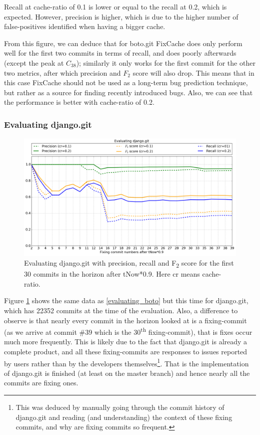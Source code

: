 \documentclass[12pt,twoside,notitlepage]{report}
\newcommand{\fxch}{FixCache}
\begin{document}
Recall at cache-ratio of 0.1 is lower or equal to the recall at 0.2, which is expected. However, precision is higher, which is due to the higher number of false-positives identified when having a bigger cache.

From this figure, we can deduce that for boto.git \fxch{} does only perform well for the first two commits in terms of recall, and does poorly afterwards (except the peak at $C_{38}$); similarly it only works for the first commit for the other two metrics, after which precision and $F_2$ score will also drop. This means that in this case \fxch{} should not be used as a long-term bug prediction technique, but rather as a source for finding recently introduced bugs. Also, we can see that the performance is better with cache-ratio of 0.2.
\subsubsection{Evaluating django.git}
\begin{figure}[ht!]
\includegraphics[width=1.0\textwidth]{evaluating_django.png}
\caption[Evaluating django.git: recall, precision and $F_2$ score]{Evaluating django.git with precision, recall and F\textsubscript{2} score for the first 30 commits in the horizon after tNow*0.9. Here cr means cache-ratio.}
\label{evaluating_django}
\end{figure}
Figure \ref{evaluating_django} shows the same data as \ref{evaluating_boto} but this time for django.git, which has 22352 commits at the time of the evaluation. Also, a difference to observe is that nearly every commit in the horizon looked at is a fixing-commit (as we arrive at commit \#39 which is the 30\textsuperscript{th} fixing-commit), that is fixes occur much more frequently. This is likely due to the fact that django.git is already a complete product, and all these fixing-commits are responses to issues reported by users rather than by the developers themselves\footnote{This was deduced by manually going through the commit history of django.git and reading (and understanding) the context of these fixing commits, and why are fixing commits so frequent.}. That is the implementation of django.git is finished (at least on the master branch) and hence nearly all the commits are fixing ones. 
\end{document}
